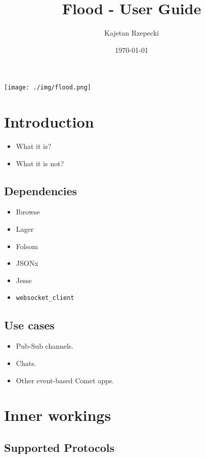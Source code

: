 \documentclass[a4paper]{article}
\title{\textbf{Flood - User Guide}}
\author{Kajetan Rzepecki}
\date{\today}
\begin{document}
\maketitle


\vfill
\begin{center}
\texttt{[image: ./img/flood.png]}
\end{center}

\vfill

\thispagestyle{empty}
\pagebreak

\tableofcontents

\pagebreak
\section{Introduction}
\label{sec-1}


\begin{itemize}
\item What it is?
\item What it is not?
\end{itemize}
\subsection{Dependencies}
\label{sec-1-1}


\begin{itemize}
\item Ibrowse
\item Lager
\item Folsom
\item JSONx
\item Jesse
\item \texttt{websocket\_client}
\end{itemize}
\subsection{Use cases}
\label{sec-1-2}


\begin{itemize}
\item Pub-Sub channels.
\item Chats.
\item Other event-based Comet apps.
\end{itemize}

\pagebreak
\section{Inner workings}
\label{sec-2}
\subsection{Supported Protocols}
\label{sec-2-1}
\end{document}
